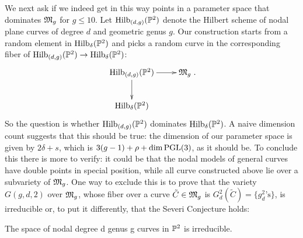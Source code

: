 We next ask if we indeed get in this way points in a parameter space 
that dominates $\mathfrak M_g$ for $g \le 10$.
Let ${\rm{Hilb}}_{(d,g)}({\mathbb P}^2)$ denote the Hilbert scheme of nodal plane curves
of degree $d$ and geometric genus $g$.
Our construction starts from  a random element in ${\rm{Hilb}}_\delta({\mathbb P}^2)$ and picks 
a random curve in the corresponding fiber of 
${\rm{Hilb}}_{(d,g)}({\mathbb P}^2)\to{\rm{Hilb}}_\delta({\mathbb P}^2)$:
$$\xymatrix{\Hilb_{(d,g)}(\PP^2) \ar[r] \ar[d] &\gM_g\\ \Hilb_\delta(\PP^2)}.$$
So the question is whether ${\rm{Hilb}}_{(d,g)}({\mathbb P}^2)$ dominates ${\rm{Hilb}}_\delta({\mathbb P}^2)$.
A naive dimension count suggests that this should be true:
the dimension of our parameter space is given by $2\delta +s$, 
which is $3(g-1)+\rho+\dim\operatorname{PGL}(3)$, as it should be.
To conclude this there is more to verify: 
it could be that the nodal models of general curves have double points 
in special position, 
while all curve constructed above lie over a subvariety of $\mathfrak M_g$. 
One way to exclude this is to prove that the variety $G(g,d,2)$ over $\mathfrak M_g$,
whose fiber over a curve ${\tilde C}\in\mathfrak M_g$ is $G^2_d(\tilde C)=\{g^2_d\text{'s}\}$,
is irreducible or, to put it differently, that the Severi Conjecture holds:

\begin{theorem} The space
of nodal degree d genus g curves in ${\mathbb P}^2$ is irreducible.
\end{theorem}

